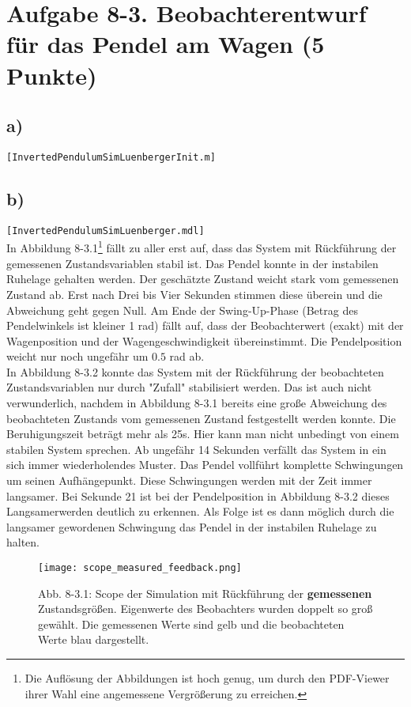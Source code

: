 \documentclass[11pt]{scrartcl} %
\begin{document}
\section*{Aufgabe 8-3. Beobachterentwurf für das Pendel am Wagen (5 Punkte)}
\subsection*{a)}
\verb+[InvertedPendulumSimLuenbergerInit.m]+

\subsection*{b)}
\verb+[InvertedPendulumSimLuenberger.mdl]+\\

In Abbildung 8-3.1\footnote{Die Auflösung der Abbildungen ist hoch genug, um durch den PDF-Viewer ihrer Wahl eine angemessene Vergrößerung zu erreichen.} fällt zu aller erst auf, dass das System mit Rückführung der gemessenen Zustandsvariablen stabil ist. Das Pendel konnte in der instabilen Ruhelage gehalten werden.
Der geschätzte Zustand weicht stark vom gemessenen Zustand ab. Erst nach Drei bis Vier Sekunden stimmen diese überein und die Abweichung geht gegen Null. Am Ende der Swing-Up-Phase (Betrag des Pendelwinkels ist kleiner 1 rad) fällt auf, dass der Beobachterwert (exakt) mit der Wagenposition und der Wagengeschwindigkeit übereinstimmt. Die Pendelposition weicht nur noch ungefähr um $0.5$ rad ab.
\\

In Abbildung 8-3.2 konnte das System mit der Rückführung der beobachteten Zustandsvariablen nur durch "Zufall" stabilisiert werden. Das ist auch nicht verwunderlich, nachdem in Abbildung \mbox{8-3.1} bereits eine große Abweichung des beobachteten Zustands vom gemessenen Zustand festgestellt werden konnte. Die Beruhigungszeit beträgt mehr als 25s. Hier kann man nicht unbedingt von einem stabilen System sprechen.
Ab ungefähr 14 Sekunden verfällt das System in ein sich immer wiederholendes Muster. Das Pendel vollführt komplette Schwingungen um seinen Aufhängepunkt. Diese Schwingungen werden mit der Zeit immer langsamer. Bei Sekunde 21 ist bei der Pendelposition in Abbildung 8-3.2 dieses Langsamerwerden deutlich zu erkennen. Als Folge ist es dann möglich durch die langsamer gewordenen Schwingung das Pendel in der instabilen Ruhelage zu halten.

\begin{figure}[H]
\centering
\texttt{[image: scope\_measured\_feedback.png]}
\captionsetup{labelformat=empty}
\caption{Abb. 8-3.1: Scope der Simulation mit Rückführung der \textbf{gemessenen} Zustandsgrößen. Eigenwerte des Beobachters wurden doppelt so groß gewählt. Die gemessenen Werte sind gelb und die beobachteten Werte blau dargestellt.}
\end{figure}
\end{document}
